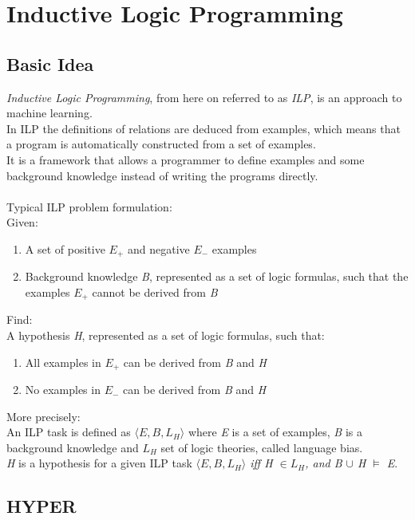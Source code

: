 \documentclass[11pt]{article}
\begin{document}
\section{Inductive Logic Programming}

\subsection{Basic Idea}

\emph{Inductive Logic Programming}, from here on referred to as \emph{ILP}, is an approach to machine learning.\\
In ILP the definitions of relations are deduced from examples, which means that a program is automatically constructed from a set of examples.\\
It is a framework that allows a programmer to define examples and some background knowledge instead of writing the programs directly.\\\\
Typical ILP problem formulation:\\Given:
\begin{enumerate}
\item A set of positive \emph{$E_+$} and negative \emph{$E_-$} examples
\item Background knowledge \emph{B}, represented as a set of logic formulas, such that the examples \emph{$E_+$} cannot be derived from \emph{B}
\end{enumerate}
Find:\\
A hypothesis \emph{H}, represented as a set of logic formulas, such that:
\begin{enumerate}
\item All examples in \emph{$E_+$} can be derived from \emph{B} and \emph{H}
\item No examples in \emph{$E_-$} can be derived from \emph{B} and \emph{H}
\end{enumerate}
More precisely:
\\
An ILP task is defined as \emph{$\langle E, B, L_H\rangle$} where \emph{E} is a set of examples, \emph{B} is a background knowledge and \emph{$L_H$} set of logic theories, called language bias.\\
\emph{H} is a hypothesis for a given ILP task \emph{$\langle E, B, L_H\rangle$ iff H $\in L_H$, and B $\cup$ H $\models$ E}. 

\subsection{HYPER}
\end{document}
